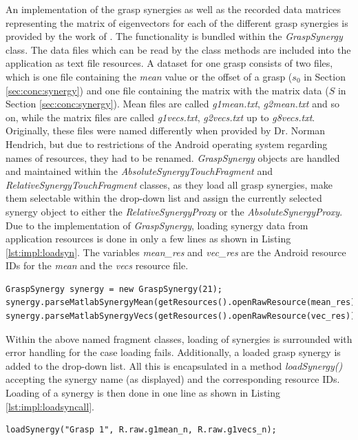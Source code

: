 An implementation of the grasp synergies as well as the recorded data matrices representing the matrix of eigenvectors for each of the different grasp synergies is provided by the work of \citeauthor{Bernardino2013}. The functionality is bundled within the \textit{GraspSynergy} class. The data files which can be read by the class methods are included into the application as text file resources. A dataset for one grasp consists of two files, which is one file containing the \textit{mean} value or the offset of a grasp ($s_0$ in Section \ref{sec:conc:synergy}) and one file containing the matrix with the matrix data ($S$ in Section \ref{sec:conc:synergy}). Mean files are called \textit{g1mean.txt}, \textit{g2mean.txt} and so on, while the matrix files are called \textit{g1vecs.txt}, \textit{g2vecs.txt} up to \textit{g8vecs.txt}. Originally, these files were named differently when provided by Dr. Norman Hendrich, but due to restrictions of the Android operating system regarding names of resources, they had to be renamed.
\textit{GraspSynergy} objects are handled and maintained within the \textit{AbsoluteSynergyTouchFragment} and \textit{RelativeSynergyTouchFragment} classes, as they load all grasp synergies, make them selectable within the drop-down list and assign the currently selected synergy object to either the \textit{RelativeSynergyProxy} or the \textit{AbsoluteSynergyProxy}. Due to the implementation of \textit{GraspSynergy}, loading synergy data from application resources is done in only a few lines as shown in Listing \ref{lst:impl:loadsyn}. The variables \textit{mean\_res} and \textit{vec\_res} are the Android resource IDs for the \textit{mean} and the \textit{vecs} resource file.
\begin{lstlisting}[caption={Loading GraspSynergy data}, label=lst:impl:loadsyn]
GraspSynergy synergy = new GraspSynergy(21);
synergy.parseMatlabSynergyMean(getResources().openRawResource(mean_res));
synergy.parseMatlabSynergyVecs(getResources().openRawResource(vec_res));
\end{lstlisting}

Within the above named fragment classes, loading of synergies is surrounded with error handling for the case loading fails. Additionally, a loaded grasp synergy is added to the drop-down list. All this is encapsulated in a method \textit{loadSynergy()} accepting the synergy name (as displayed) and the corresponding resource IDs. Loading of a synergy is then done in one line as shown in Listing \ref{lst:impl:loadsyncall}.
\begin{lstlisting}[caption={Call to loadSynergy()}, label=lst:impl:loadsyncall]
loadSynergy("Grasp 1", R.raw.g1mean_n, R.raw.g1vecs_n);
\end{lstlisting}

